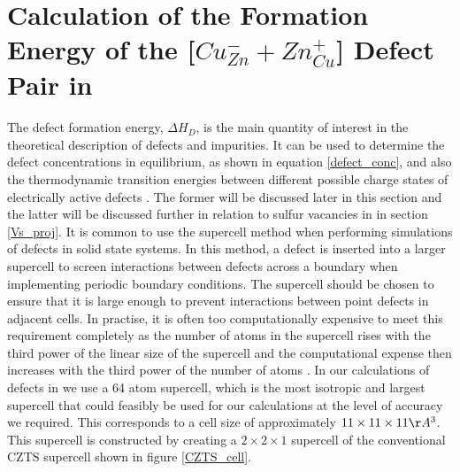 \chapter{Calculation of the Formation Energy of the [$Cu_{Zn}^- + Zn_{Cu}^+$] Defect Pair in {\CZTS}}\label{Cu-Zn_defects_calc}
The defect formation energy, $\Delta H_D$, is the main quantity of interest in the theoretical description of defects and impurities. It can be used to determine the defect concentrations in equilibrium, as shown in equation \ref{defect_conc}, and also the thermodynamic transition energies between different possible charge states of electrically active defects \cite{defects_Lany}. The former will be discussed later in this section and the latter will be discussed further in relation to sulfur vacancies in {\CZTS} in section \ref{Vs_proj}. 
It is common to use the supercell method when performing simulations of defects in solid state systems. 
In this method, a defect is inserted into a larger supercell to screen interactions between defects across a boundary when implementing periodic boundary conditions. The supercell should be chosen to ensure that it is large enough to prevent interactions between point defects in adjacent cells. In practise, it is often too computationally expensive to meet this requirement completely as the number of atoms in the supercell rises with the third power of the linear size of the supercell and the computational expense then increases with the third power of the number of atoms \cite{supercell_method}. In our calculations of defects in {\CZTS} we use a 64 atom supercell, which is the most isotropic and largest supercell that could feasibly be used for our calculations at the level of accuracy we required. This corresponds to a cell size of approximately $11\times11\times11 \AA^3$. This supercell is constructed by creating a $2\times2\times1$ supercell of the conventional CZTS supercell shown in figure \ref{CZTS_cell}.

